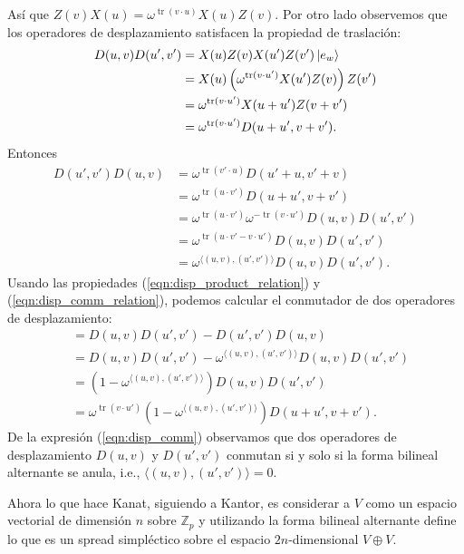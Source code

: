 \documentclass[a4paper]{report}
\DeclareMathOperator{\tr}{tr}
\begin{document}
  Así que $Z(v)X(u) = \omega^{\tr(v \cdot u)} X(u)Z(v)$. Por
  otro lado observemos que los operadores de desplazamiento
  satisfacen la propiedad de traslación:
  \begin{align}
    D(u,v) D(u',v')
    &= X(u)Z(v) X(u')Z(v') \ket{e_w} \\
    &= X(u) \left( \omega^{\tr(v \cdot u')} X(u') Z(v)
    \right) Z(v') \\
    &= \omega^{\tr(v \cdot u')} X(u+u') Z(v + v') \\
    &= \omega^{\tr(v \cdot u')} D(u+u',v+v')
    \label{eqn:disp_product_relation}.
  \end{align}
  Entonces
  \begin{align}
    D(u',v')D(u,v)
    &= \omega^{\tr(v' \cdot u)} D(u'+u,v'+v) \\
    &= \omega^{\tr(u \cdot v')} D(u+u',v+v') \\
    &= \omega^{\tr(u \cdot v')} \omega^{-\tr(v \cdot u')}
    D(u,v)D(u',v') \\
    &= \omega^{\tr(u \cdot v' - v \cdot u')} D(u,v)D(u',v')
    \\
    &= \omega^{\langle (u,v), (u',v') \rangle}
    D(u,v)D(u',v') \label{eqn:disp_comm_relation}.
  \end{align}
  Usando las propiedades (\ref{eqn:disp_product_relation}) y
  (\ref{eqn:disp_comm_relation}), podemos calcular el
  conmutador de dos operadores de desplazamiento: 
  \begin{align}
    [D(u,v),D(u',v')]
    &= D(u,v)D(u',v') - D(u',v')D(u,v) \\
    &= D(u,v)D(u',v') - \omega^{\langle (u,v),(u',v')
    \rangle} D(u,v) D(u',v') \\
    &= \left( 1 - \omega^{\langle (u,v),(u',v') \rangle}
    \right) D(u,v)D(u',v') \\
    &= \omega^{\tr(v \cdot u')} \left( 1 - \omega^{\langle
    (u,v),(u',v') \rangle} \right) D(u+u',v+v').
    \label{eqn:disp_comm}
  \end{align}
  De la expresión (\ref{eqn:disp_comm}) observamos que dos
  operadores de desplazamiento $D(u,v)$ y $D(u',v')$
  conmutan si y solo si la forma bilineal alternante se
  anula, i.e., $\langle (u,v), (u',v') \rangle = 0$.

  Ahora lo que hace Kanat, siguiendo a Kantor, es considerar
  a $V$ como un espacio vectorial de dimensión $n$ sobre
  $\mathbb Z_p$ y utilizando la forma bilineal alternante
  define lo que es un spread simpléctico sobre el espacio
  $2n$-dimensional $V \oplus V$.
\end{document}
